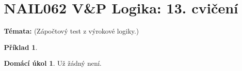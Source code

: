 \documentclass[a4paper]{article}
\theoremstyle{definition}
\newtheorem{problem}{Příklad}
\newtheorem*{ukol}{Domácí úkol}
\begin{document}
\section*{NAIL062 V\&P Logika: 13. cvičení}


\textbf{Témata:}
(Zápočtový test z výrokové logiky.)


\medskip\begin{problem}
 
\end{problem}


\medskip\begin{ukol}
Už žádný není.
\end{ukol}
\end{document}
